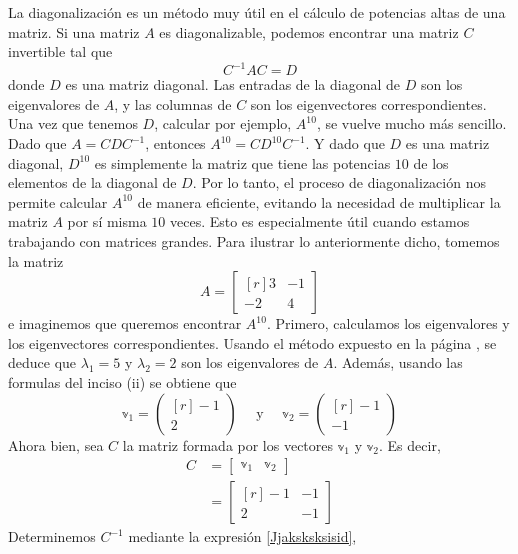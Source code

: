 \begin{example}
    La diagonalización es un método muy útil en el cálculo de potencias altas de una matriz. Si una matriz $A$ es diagonalizable, podemos encontrar una matriz $C$ invertible tal que
    $$C^{-1}AC = D$$
    donde $D$ es una matriz diagonal. Las entradas de la diagonal de $D$ son los eigenvalores de $A$, y las columnas de $C$ son los eigenvectores correspondientes. Una vez que tenemos $D$, calcular por ejemplo, $A^{10}$, se vuelve mucho más sencillo. Dado que $A = CDC^{-1}$, entonces $A^{10} = CD^{10}C^{-1}$. Y dado que $D$ es una matriz diagonal, $D^{10}$ es simplemente la matriz que tiene las potencias $10$ de los elementos de la diagonal de $D$. Por lo tanto, el proceso de diagonalización nos permite calcular $A^{10}$ de manera eficiente, evitando la necesidad de multiplicar la matriz $A$ por sí misma $10$ veces. Esto es especialmente útil cuando estamos trabajando con matrices grandes. Para ilustrar lo anteriormente dicho, tomemos la matriz
    $$A = \begin{bmatrix*}[r]
        3 & - 1 \\
        - 2 & 4
    \end{bmatrix*}$$
    e imaginemos que queremos encontrar $A^{10}$. Primero, calculamos los eigenvalores y los eigenvectores correspondientes. Usando el método expuesto en la página \pageref{metodo_eigen_2x2}, se deduce que $\lambda_1 = 5$ y $\lambda_2 = 2$ son los eigenvalores de $A$. Además, usando las formulas del inciso (ii) se obtiene que
    $$\mathbb{v}_1 = \begin{pmatrix*}[r]
        -1 \\
        2
    \end{pmatrix*} \quad \text{ y } \quad \mathbb{v}_2 = \begin{pmatrix*}[r]
        -1 \\
        -1
    \end{pmatrix*}$$
    Ahora bien, sea $C$ la matriz formada por los vectores $\mathbb{v}_1$ y $\mathbb{v}_2$. Es decir,
    \begin{align*}
        C & = \begin{bmatrix} \mathbb{v}_1 & \mathbb{v}_2 \end{bmatrix} \\
        & = \begin{bmatrix*}[r] -1 & -1 \\ 2 & -1 \end{bmatrix*}
    \end{align*}
    Determinemos $C^{-1}$ mediante la expresión \ref{Jjaksksksisid},

\end{example}
